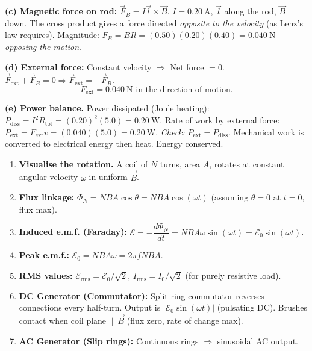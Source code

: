 \documentclass[11pt]{article}
\begin{document}
\begin{exoresolu}
\textbf{(c) Magnetic force on rod:} $\vec{F}_B = I \vec{l} \times \vec{B}$. $I=0.20\ \mathrm{A}$, $\vec{l}$ along the rod, $\vec{B}$ down. The cross product gives a force directed \emph{opposite to the velocity} (as Lenz's law requires).
Magnitude: $F_B = BIl = (0.50)(0.20)(0.40) = \boxed{0.040\ \mathrm{N}}$ \emph{opposing the motion}.

\textbf{(d) External force:} Constant velocity $\Rightarrow$ Net force $=0$. $\vec{F}_{\text{ext}} + \vec{F}_B = 0 \Rightarrow \vec{F}_{\text{ext}} = -\vec{F}_B$.
\[
F_{\text{ext}} = \boxed{0.040\ \mathrm{N}} \text{ in the direction of motion}.
\]

\textbf{(e) Power balance.}
Power dissipated (Joule heating): $P_{\text{diss}} = I^2 R_{\text{tot}} = (0.20)^2(5.0) = \boxed{0.20\ \mathrm{W}}$.
Rate of work by external force: $P_{\text{ext}} = F_{\text{ext}} v = (0.040)(5.0) = \boxed{0.20\ \mathrm{W}}$.
\textit{Check:} $P_{\text{ext}} = P_{\text{diss}}$. Mechanical work is converted to electrical energy then heat. Energy conserved.
\end{exoresolu}

\begin{methode}
\begin{enumerate}
\item \textbf{Visualise the rotation.} A coil of $N$ turns, area $A$, rotates at constant angular velocity $\omega$ in uniform $\vec{B}$.
\item \textbf{Flux linkage:} $\Phi_N = NBA\cos\theta = NBA\cos(\omega t)$ (assuming $\theta=0$ at $t=0$, flux max).
\item \textbf{Induced e.m.f. (Faraday):} $\mathcal{E} = -\dfrac{d\Phi_N}{dt} = NBA\omega\sin(\omega t) = \mathcal{E}_0\sin(\omega t)$.
\item \textbf{Peak e.m.f.:} $\mathcal{E}_0 = NBA\omega = 2\pi f NBA$.
\item \textbf{RMS values:} $\mathcal{E}_{\text{rms}} = \mathcal{E}_0/\sqrt{2}$, $I_{\text{rms}} = I_0/\sqrt{2}$ (for purely resistive load).
\item \textbf{DC Generator (Commutator):} Split-ring commutator reverses connections every half-turn. Output is $|\mathcal{E}_0\sin(\omega t)|$ (pulsating DC). Brushes contact when coil plane $\parallel \vec{B}$ (flux zero, rate of change max).
\item \textbf{AC Generator (Slip rings):} Continuous rings $\Rightarrow$ sinusoidal AC output.
\end{enumerate}
\end{methode}
\end{document}
